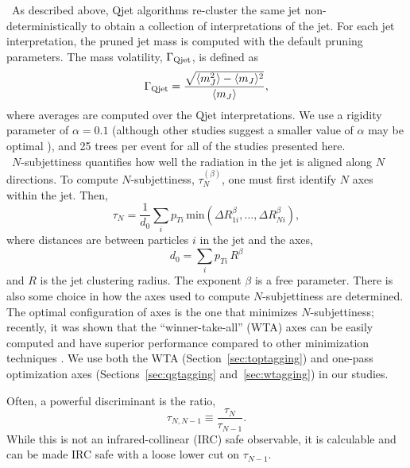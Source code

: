 ~As described above, Qjet algorithms re-cluster the same jet non-deterministically to obtain a collection of interpretations of the jet. For each jet interpretation, the pruned jet mass is computed with the default pruning parameters. The mass volatility, $\Gamma_{\rm Qjet}$, is defined as \cite{Ellis:2012sn}
%
\begin{equation}
\Gamma_{\rm Qjet} = \frac{\sqrt{\langle m_J^2 \rangle-\langle m_J\rangle^2}}{\langle m_J\rangle},
\end{equation}
%
where averages are computed over the Qjet interpretations. We use a rigidity parameter of $\alpha=0.1$ (although other studies suggest a smaller value of $\alpha$ may be optimal \cite{Ellis:2012sn,Ellis:2014eya}), and 25 trees per event for all of the studies presented here.\\

~$N$-subjettiness \cite{Thaler:2010tr} quantifies how well the radiation in the jet is aligned along $N$ directions. To compute $N$-subjettiness, $\tau_N^{(\beta)}$, one must first identify $N$ axes within the jet. Then,
%
\begin{equation}
\tau_N = \frac{1}{d_0} \sum_i p_{Ti} \,\mathrm{min}\left( \Delta R_{1i}^\beta,\ldots,\Delta R_{Ni}^\beta\right),
\end{equation}
%
where distances are between particles $i$ in the jet and the axes,
%
\begin{equation}
d_0 = \sum_i p_{Ti}\,R^\beta
\end{equation}
%
and $R$ is the jet clustering radius. The exponent $\beta$ is a free parameter. There is also some choice in how the axes used to compute $N$-subjettiness are determined. The optimal configuration of axes is the one that minimizes
$N$-subjettiness; recently, it was shown that the ``winner-take-all'' (WTA) axes can be easily computed and have superior performance compared to other minimization techniques \cite{Larkoski:2014uqa}. We use both the WTA (Section~\ref{sec:toptagging}) and one-pass \kT optimization axes (Sections~\ref{sec:qgtagging} and~\ref{sec:wtagging}) in our studies.

Often, a  powerful discriminant is  the ratio,
%
\begin{equation}
\tau_{N,N-1} \equiv \frac{\tau_N}{\tau_{N-1}}.
\end{equation}
%
While this is not an infrared-collinear (IRC) safe observable, it is calculable \cite{Larkoski:2013paa} and can be made IRC safe with a loose lower cut on $\tau_{N-1}$.\\


